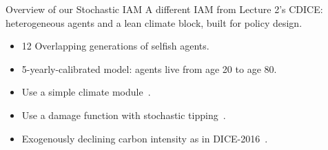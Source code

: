 \documentclass[aspectratio=169,11pt]{beamer}
\newcommand{\emphc}[1]{\textcolor{harvardcrimson}{#1}}
\begin{document}
\begin{frame}[fragile]{Overview of our Stochastic IAM}
{\small A \emphc{different IAM} from Lecture 2's CDICE: heterogeneous agents and a lean climate block, built for policy design.}
\begin{itemize}
    \item 12 Overlapping generations of selfish agents.
            \vspace{0.35cm}
    \item 5-yearly-calibrated model: agents live from age 20 to age 80.
            \vspace{0.35cm}
    \item Use a simple climate module~\citep{Dietz2020}.
            \vspace{0.35cm}
    \item Use a damage function with stochastic tipping~\citep{kotlikoffParetoimprovingCarbonriskTaxation2021a}.
            \vspace{0.35cm}
    \item Exogenously declining carbon intensity as in DICE-2016~\citep{nordhaus2017revisiting}.
\end{itemize}
\end{frame}
\end{document}
